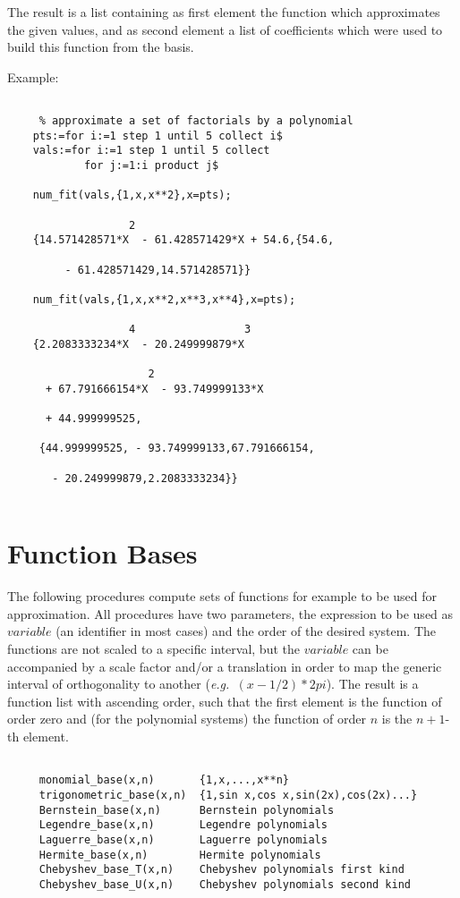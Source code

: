 The result is a list containing as first element the
function which approximates the given values, and as
second element a list of coefficients which were used
to build this function from the basis.

Example:

\begin{verbatim}

     % approximate a set of factorials by a polynomial
    pts:=for i:=1 step 1 until 5 collect i$
    vals:=for i:=1 step 1 until 5 collect
            for j:=1:i product j$

    num_fit(vals,{1,x,x**2},x=pts);

                   2
    {14.571428571*X  - 61.428571429*X + 54.6,{54.6,

         - 61.428571429,14.571428571}}

    num_fit(vals,{1,x,x**2,x**3,x**4},x=pts);

                   4                 3
    {2.2083333234*X  - 20.249999879*X

                      2
      + 67.791666154*X  - 93.749999133*X

      + 44.999999525,

     {44.999999525, - 93.749999133,67.791666154,

       - 20.249999879,2.2083333234}}


\end{verbatim}

\section{Function Bases}

The following procedures compute sets of functions
for example to be used for approximation.
All procedures have
two parameters, the expression to be used as $variable$
(an identifier in most cases) and the
order of the desired system.
The functions are not scaled to a specific interval, but
the $variable$ can be accompanied by a scale factor
and/or a translation
in order to map the generic interval of orthogonality to another
({\em e.g.\ }$(x- 1/2 ) * 2 pi$).
The result is a function list with ascending order, such that
the first element is the function of order zero and (for
the polynomial systems) the function of order $n$ is the $n+1$-th
element.

\begin{verbatim}

     monomial_base(x,n)       {1,x,...,x**n}
     trigonometric_base(x,n)  {1,sin x,cos x,sin(2x),cos(2x)...}
     Bernstein_base(x,n)      Bernstein polynomials
     Legendre_base(x,n)       Legendre polynomials
     Laguerre_base(x,n)       Laguerre polynomials
     Hermite_base(x,n)        Hermite polynomials
     Chebyshev_base_T(x,n)    Chebyshev polynomials first kind
     Chebyshev_base_U(x,n)    Chebyshev polynomials second kind

\end{verbatim}

